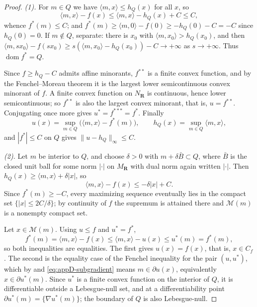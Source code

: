 \begin{proof}
\emph{(1).}  For \(m\in Q\) we have \(\langle m,x\rangle\leq h_Q(x)\) for all
\(x\), so
\[
 \langle m,x\rangle-f(x)\leq\langle m,x\rangle-h_Q(x)+C\leq C,
\]
whence \(f^*(m)\leq C\); and \(f^*(m)\geq\langle m,0\rangle-f(0)\geq
-h_Q(0)-C=-C\) since \(h_Q(0)=0\).  If \(m\notin Q\), separate: there is
\(x_0\) with \(\langle m,x_0\rangle>h_Q(x_0)\), and then
\(\langle m,sx_0\rangle-f(sx_0)\geq
s(\langle m,x_0\rangle-h_Q(x_0))-C\to+\infty\) as \(s\to+\infty\).  Thus
\(\operatorname{dom}f^*=Q\).

Since \(f\geq h_Q-C\) admits affine minorants, \(f^{**}\) is a finite convex
function, and by the Fenchel--Moreau theorem
 it is the largest lower semicontinuous convex
minorant of \(f\).  A finite convex function on \(N_{\mathbf R}\) is
continuous, hence lower semicontinuous; so \(f^{**}\) is also the largest
convex minorant, that is, \(u=f^{**}\).  Conjugating once more gives
\(u^*=f^{***}=f^*\).  Finally
\[
 u(x)=\sup_{m\in Q}\bigl(\langle m,x\rangle-f^*(m)\bigr),
 \qquad
 h_Q(x)=\sup_{m\in Q}\langle m,x\rangle,
\]
and \(|f^*|\leq C\) on \(Q\) gives
\(\lVert u-h_Q\rVert_\infty\leq C\).

\emph{(2).}  Let \(m\) be interior to \(Q\), and choose \(\delta>0\) with
\(m+\delta \bar B\subset Q\), where \(\bar B\) is the closed unit ball for
some norm \(|\cdot|\) on \(M_{\mathbf R}\) with dual norm again written
\(|\cdot|\).  Then \(h_Q(x)\geq\langle m,x\rangle+\delta|x|\), so
\[
 \langle m,x\rangle-f(x)\leq-\delta|x|+C .
\]
Since \(f^*(m)\geq-C\), every maximizing sequence eventually lies in the
compact set \(\{|x|\leq2C/\delta\}\); by continuity of \(f\) the supremum is
attained there and \(\mathcal M(m)\) is a nonempty compact set.

Let \(x\in\mathcal M(m)\).  Using \(u\leq f\) and \(u^*=f^*\),
\[
 f^*(m)=\langle m,x\rangle-f(x)
       \leq\langle m,x\rangle-u(x)
       \leq u^*(m)=f^*(m),
\]
so both inequalities are equalities.  The first gives \(u(x)=f(x)\), that is,
\(x\in C_f\).  The second is the equality case of the Fenchel inequality for
the pair \((u,u^*)\), which by
 and \eqref{eq:appD-subgradient} means
\(m\in\partial u(x)\), equivalently \(x\in\partial u^*(m)\).  Since \(u^*\)
is a finite convex function on the interior of \(Q\), it is differentiable
outside a Lebesgue-null set, and at a differentiability point
\(\partial u^*(m)=\{\nabla u^*(m)\}\); the boundary of \(Q\) is also
Lebesgue-null.


\end{proof}
